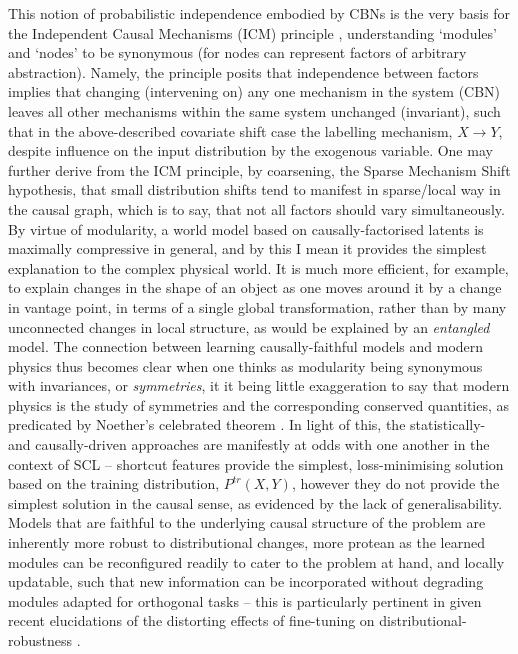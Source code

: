 %
This notion of probabilistic independence embodied by \acp{CBN} is the very basis for the Independent
Causal Mechanisms (ICM) principle \citep{scholkopf2021toward}, understanding `modules' and `nodes'
to be synonymous (for nodes can represent factors of arbitrary abstraction).
%
Namely, the principle posits that independence between factors implies that changing (intervening
on) any one mechanism in the system (CBN) leaves all other mechanisms within the same system
unchanged (invariant), such that in the above-described covariate shift case the labelling
mechanism, \(X \to Y\), despite influence on the input distribution by the exogenous variable.
%
%
One may further derive from the ICM principle, by coarsening, the Sparse Mechanism Shift
hypothesis, that small distribution shifts tend to manifest in sparse/local way in the causal
graph, which is to say, that not all factors should vary simultaneously.
%
By virtue of modularity, a world model based on causally-factorised latents is maximally
compressive in general, and by this I mean it provides the simplest explanation to the complex
physical world.
%
It is much more efficient, for example, to explain changes in the shape of an object as one moves
around it by a change in vantage point, in terms of a single global transformation, rather than by
many unconnected changes in local structure, as would be explained by an \emph{entangled} model.
%
The connection between learning causally-faithful models and modern physics thus becomes clear when
one thinks as modularity being synonymous with invariances, or \emph{symmetries}, it it being
little exaggeration to say that modern physics is the study of symmetries and the corresponding
conserved quantities, as predicated by Noether's celebrated theorem \citep{noether1918invariante}.
%
In light of this, the statistically- and causally-driven approaches are manifestly at odds with one
another in the context of \ac{SCL} -- shortcut features provide the simplest, loss-minimising
solution based on the training distribution, \(P^{tr}(X, Y)\), however they do not provide the
simplest solution in the causal sense, as evidenced by the lack of generalisability.
%
Models that are faithful to the underlying causal structure of the problem are inherently more
robust to distributional changes, more protean as the learned modules can be reconfigured readily
to cater to the problem at hand, and locally updatable, such that new information can be
incorporated without degrading modules adapted for orthogonal tasks -- this is particularly
pertinent in given recent elucidations of the distorting effects of fine-tuning on
distributional-robustness \citep{andreassen2021evolution, kumar2022finetuning}.

